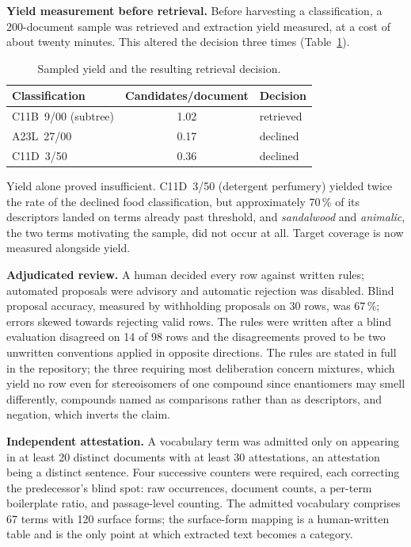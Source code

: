 \documentclass[
  computerscience
]{genesisl1-paper}
\begin{document}
\textbf{Yield measurement before retrieval.} Before harvesting a classification, a
200-document sample was retrieved and extraction yield measured, at a cost of about
twenty minutes. This altered the decision three times (Table~\ref{tab:yield}).

\begin{table}[t]
\caption{Sampled yield and the resulting retrieval decision.}
\label{tab:yield}
\centering
\begin{tabular}{lcl}
\hline
Classification & Candidates/document & Decision \\
\hline
C11B~9/00 (subtree) & 1.02 & retrieved \\
A23L~27/00          & 0.17 & declined \\
C11D~3/50           & 0.36 & declined \\
\hline
\end{tabular}
\end{table}

Yield alone proved insufficient. C11D~3/50 (detergent perfumery) yielded twice the rate
of the declined food classification, but approximately 70\,\% of its descriptors landed
on terms already past threshold, and \emph{sandalwood} and \emph{animalic}, the two terms
motivating the sample, did not occur at all. Target coverage is now measured alongside
yield.

\textbf{Adjudicated review.} A human decided every row against written rules; automated
proposals were advisory and automatic rejection was disabled. Blind proposal accuracy,
measured by withholding proposals on 30 rows, was 67\,\%; errors skewed towards rejecting
valid rows. The rules were written after a blind evaluation disagreed on 14 of 98 rows
and the disagreements proved to be two unwritten conventions applied in opposite
directions. The rules are stated in full in the repository; the three requiring most
deliberation concern mixtures, which yield no row even for stereoisomers of one compound
since enantiomers may smell differently, compounds named as comparisons rather than as
descriptors, and negation, which inverts the claim.

\textbf{Independent attestation.} A vocabulary term was admitted only on appearing in at
least 20 distinct documents with at least 30 attestations, an attestation being a
distinct sentence. Four successive counters were required, each correcting the
predecessor's blind spot: raw occurrences, document counts, a per-term boilerplate ratio,
and passage-level counting. The admitted vocabulary comprises 67 terms with 120 surface
forms; the surface-form mapping is a human-written table and is the only point at which
extracted text becomes a category.
\end{document}
